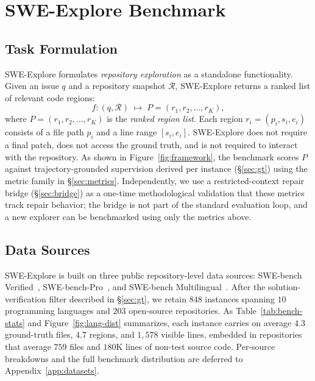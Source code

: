 \section{SWE-Explore Benchmark}



\subsection{Task Formulation}
SWE-Explore formulates \emph{repository exploration} as a standalone functionality. Given an issue $q$ and a repository snapshot $\mathcal{R}$, SWE-Explore returns a ranked list of relevant code regions: 
\[
  f : (q, \mathcal{R}) \;\mapsto\; P = (r_1, r_2, \ldots, r_K),
\]
where \(P= (r_1, r_2, \ldots, r_K)\) is the \emph{ranked region list}. Each region $r_i = (p_i, s_i, e_i)$ consists of a file path $p_i$ and a line range $[s_i, e_i]$. SWE-Explore does not require a final patch, does not access the ground truth, and is not required to interact with the repository. As shown in Figure~\ref{fig:framework}, the benchmark scores $P$ against trajectory-grounded supervision derived per instance (\S\ref{sec:gt}) using the metric family in \S\ref{sec:metrics}. Independently, we use a restricted-context repair bridge (\S\ref{sec:bridge}) as a one-time methodological validation that these metrics track repair behavior; the bridge is not part of the standard evaluation loop, and a new explorer can be benchmarked using only the metrics above.




\subsection{Data Sources}
\label{sec:stats}
SWE-Explore is built on three public repository-level data sources: SWE-bench Verified~\citep{jimenez2024swebench,chowdhury2024swebenchverified}, SWE-bench-Pro~\citep{deng2025swebenchproaiagents}, and SWE-bench Multilingual~\citep{yang2025swesmith}. After the solution-verification filter described in \S\ref{sec:gt}, we retain $848$ instances spanning $10$ programming languages and $203$ open-source repositories. As Table~\ref{tab:bench-stats} and Figure~\ref{fig:lang-dist} summarizes, each instance carries on average $4.3$ ground-truth files, $4.7$ regions, and $1{,}578$ visible lines, embedded in repositories that average $759$ files and $180$K lines of non-test source code. Per-source breakdowns and the full benchmark distribution are deferred to Appendix~\ref{app:datasets}.





